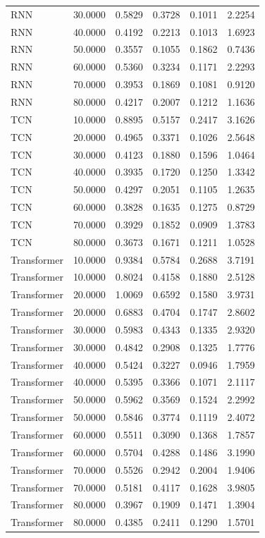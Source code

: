\begin{tabular}{lrrrrr}
RNN & 30.0000 & 0.5829 & 0.3728 & 0.1011 & 2.2254 \\
RNN & 40.0000 & 0.4192 & 0.2213 & 0.1013 & 1.6923 \\
RNN & 50.0000 & 0.3557 & 0.1055 & 0.1862 & 0.7436 \\
RNN & 60.0000 & 0.5360 & 0.3234 & 0.1171 & 2.2293 \\
RNN & 70.0000 & 0.3953 & 0.1869 & 0.1081 & 0.9120 \\
RNN & 80.0000 & 0.4217 & 0.2007 & 0.1212 & 1.1636 \\
TCN & 10.0000 & 0.8895 & 0.5157 & 0.2417 & 3.1626 \\
TCN & 20.0000 & 0.4965 & 0.3371 & 0.1026 & 2.5648 \\
TCN & 30.0000 & 0.4123 & 0.1880 & 0.1596 & 1.0464 \\
TCN & 40.0000 & 0.3935 & 0.1720 & 0.1250 & 1.3342 \\
TCN & 50.0000 & 0.4297 & 0.2051 & 0.1105 & 1.2635 \\
TCN & 60.0000 & 0.3828 & 0.1635 & 0.1275 & 0.8729 \\
TCN & 70.0000 & 0.3929 & 0.1852 & 0.0909 & 1.3783 \\
TCN & 80.0000 & 0.3673 & 0.1671 & 0.1211 & 1.0528 \\
Transformer & 10.0000 & 0.9384 & 0.5784 & 0.2688 & 3.7191 \\
Transformer & 10.0000 & 0.8024 & 0.4158 & 0.1880 & 2.5128 \\
Transformer & 20.0000 & 1.0069 & 0.6592 & 0.1580 & 3.9731 \\
Transformer & 20.0000 & 0.6883 & 0.4704 & 0.1747 & 2.8602 \\
Transformer & 30.0000 & 0.5983 & 0.4343 & 0.1335 & 2.9320 \\
Transformer & 30.0000 & 0.4842 & 0.2908 & 0.1325 & 1.7776 \\
Transformer & 40.0000 & 0.5424 & 0.3227 & 0.0946 & 1.7959 \\
Transformer & 40.0000 & 0.5395 & 0.3366 & 0.1071 & 2.1117 \\
Transformer & 50.0000 & 0.5962 & 0.3569 & 0.1524 & 2.2992 \\
Transformer & 50.0000 & 0.5846 & 0.3774 & 0.1119 & 2.4072 \\
Transformer & 60.0000 & 0.5511 & 0.3090 & 0.1368 & 1.7857 \\
Transformer & 60.0000 & 0.5704 & 0.4288 & 0.1486 & 3.1990 \\
Transformer & 70.0000 & 0.5526 & 0.2942 & 0.2004 & 1.9406 \\
Transformer & 70.0000 & 0.5181 & 0.4117 & 0.1628 & 3.9805 \\
Transformer & 80.0000 & 0.3967 & 0.1909 & 0.1471 & 1.3904 \\
Transformer & 80.0000 & 0.4385 & 0.2411 & 0.1290 & 1.5701 \\
\bottomrule
\end{tabular}
